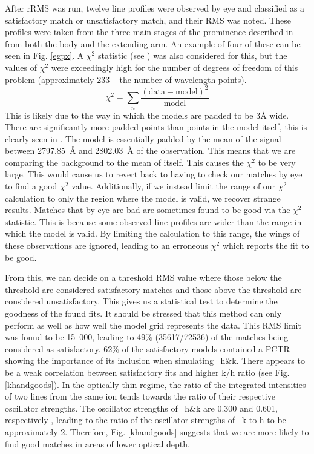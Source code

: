 After rRMS was run, twelve line profiles were observed by eye and classified as a satisfactory match or unsatisfactory match, and their RMS was noted. These profiles were taken from the three main stages of the prominence described in  from both the body and the extending arm. An example of four of these can be seen in Fig. \ref{egpx}. A $\chi^2$ statistic (see ) was also considered for this, but the values of $\chi^2$ were exceedingly high for the number of degrees of freedom of this problem (approximately 233 -- the number of wavelength points). 
\begin{equation}
    \chi^2=\sum_n\frac{\left(\text{data}-\text{model}\right)^2}{\text{model}}
    \label{chi2}
\end{equation}
This is likely due to the way in which the models are padded to be 3\AA{} wide. There are significantly more padded points than points in the model itself, this is clearly seen in . The model is essentially padded by the mean of the signal between 2797.85~\AA{} and 2802.03~\AA{} of the observation. This means that we are comparing the background to the mean of itself. This causes the $\chi^2$ to be very large. This would cause us to revert back to having to check our matches by eye to find a good $\chi^2$ value. Additionally, if we instead limit the range of our $\chi^2$ calculation to only the region where the model is valid, we recover strange results. Matches that by eye are bad are sometimes found to be good via the $\chi^2$ statistic. This is because some observed line profiles are wider than the range in which the model is valid. By limiting the calculation to this range, the wings of these observations are ignored, leading to an erroneous $\chi^2$ which reports the fit to be good.

From this, we can decide on a threshold RMS value where those below the threshold are considered satisfactory matches and those above the threshold are considered unsatisfactory. This gives us a statistical test to determine the goodness of the found fits. It should be stressed that this method can only perform as well as how well the model grid represents the data. This RMS limit was found to be 15~000, leading to 49\% (35617/72536) of the matches being considered as satisfactory. 62\% of the satisfactory models contained a PCTR showing the importance of its inclusion when simulating \mgii~h\&k. There appears to be a weak correlation between satisfactory fits and higher k/h ratio (see Fig. \ref{khandgoods}). In the optically thin regime, the ratio of the integrated intensities of two lines from the same ion tends towards the ratio of their respective oscillator strengths. The oscillator strengths of \mgii~h\&k are 0.300 and 0.601, respectively \citep{theodosiou_accurate_1999}, leading  to the ratio of the oscillator strengths of \mgii\ k to \mgii{} h to be approximately 2. Therefore, Fig. \ref{khandgoods} suggests that we are more likely to find good matches in areas of lower optical depth. 




